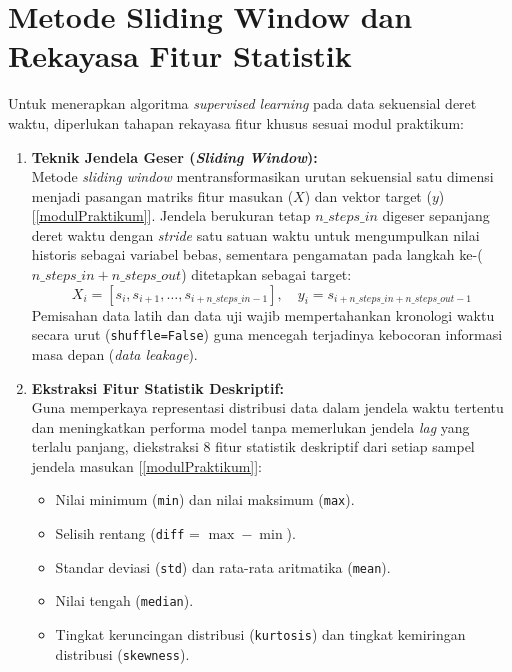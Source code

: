 \documentclass[a4paper,oneside,11pt]{book}
\begin{document}
\section{Metode Sliding Window dan Rekayasa Fitur Statistik}
Untuk menerapkan algoritma \textit{supervised learning} pada data sekuensial deret waktu, diperlukan tahapan rekayasa fitur khusus sesuai modul praktikum:
\begin{enumerate}
    \item \textbf{Teknik Jendela Geser (\textit{Sliding Window}):}\\
    Metode \textit{sliding window} mentransformasikan urutan sekuensial satu dimensi menjadi pasangan matriks fitur masukan ($X$) dan vektor target ($y$) [\ref{modulPraktikum}]. Jendela berukuran tetap $n\_steps\_in$ digeser sepanjang deret waktu dengan \textit{stride} satu satuan waktu untuk mengumpulkan nilai historis sebagai variabel bebas, sementara pengamatan pada langkah ke-($n\_steps\_in + n\_steps\_out$) ditetapkan sebagai target:
    \begin{equation}
        X_i = [s_i, s_{i+1}, \dots, s_{i+n\_steps\_in-1}], \quad y_i = s_{i+n\_steps\_in+n\_steps\_out-1}
    \end{equation}
    Pemisahan data latih dan data uji wajib mempertahankan kronologi waktu secara urut (\texttt{shuffle=False}) guna mencegah terjadinya kebocoran informasi masa depan (\textit{data leakage}).

    \item \textbf{Ekstraksi Fitur Statistik Deskriptif:}\\
    Guna memperkaya representasi distribusi data dalam jendela waktu tertentu dan meningkatkan performa model tanpa memerlukan jendela \textit{lag} yang terlalu panjang, diekstraksi 8 fitur statistik deskriptif dari setiap sampel jendela masukan [\ref{modulPraktikum}]:
    \begin{itemize}
        \item Nilai minimum (\texttt{min}) dan nilai maksimum (\texttt{max}).
        \item Selisih rentang (\texttt{diff} = $\max - \min$).
        \item Standar deviasi (\texttt{std}) dan rata-rata aritmatika (\texttt{mean}).
        \item Nilai tengah (\texttt{median}).
        \item Tingkat keruncingan distribusi (\texttt{kurtosis}) dan tingkat kemiringan distribusi (\texttt{skewness}).
    \end{itemize}
\end{enumerate}
\end{document}
